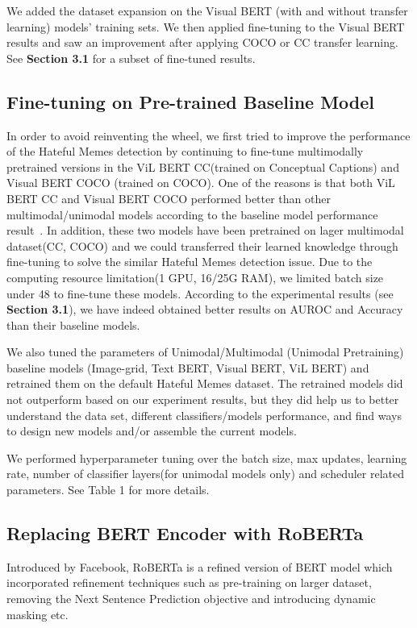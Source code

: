 \documentclass[10pt,twocolumn,letterpaper]{article}
\begin{document}
We added the dataset expansion on the Visual BERT (with and without transfer learning) models’ training sets. We then applied fine-tuning to the Visual BERT results and saw an improvement after applying COCO or CC transfer learning. See \textbf{Section 3.1} for a subset of fine-tuned results.

\subsection{Fine-tuning on Pre-trained Baseline Model}
In order to avoid reinventing the wheel, we first tried to improve the performance of the Hateful Memes detection by continuing to fine-tune multimodally pretrained versions in the ViL BERT CC(trained on Conceptual Captions) and Visual BERT COCO (trained on COCO). One of the reasons is that both ViL BERT CC and Visual BERT COCO performed better than other multimodal/unimodal models according to the baseline model performance result~\cite{Authors2}. In addition, these two models have been pretrained on lager multimodal dataset(CC, COCO) and we could transferred their learned knowledge through fine-tuning to solve the similar Hateful Memes detection issue. Due to the computing resource limitation(1 GPU, 16/25G RAM), we limited batch size under 48 to fine-tune these models. According to the experimental results (see \textbf{Section 3.1}), we have indeed obtained better results on AUROC and Accuracy than their baseline models.

We also tuned the parameters of Unimodal/Multimodal (Unimodal Pretraining) baseline models (Image-grid, Text BERT, Visual BERT, ViL BERT) and retrained them on the default Hateful Memes dataset. The retrained models did not outperform based on our experiment results, but they did help us to better understand the data set, different classifiers/models performance, and find ways to design new models and/or assemble the current models. 

We performed hyperparameter tuning over the batch size, max updates, learning rate, number of classifier layers(for unimodal models only) and scheduler related parameters. See Table 1 for more details. 

\subsection{Replacing BERT Encoder with RoBERTa}
Introduced by Facebook, RoBERTa is a refined version of BERT model which incorporated refinement techniques such as pre-training on larger dataset, removing the Next Sentence Prediction objective and introducing dynamic masking etc.~\cite{Authors4}  
\end{document}
